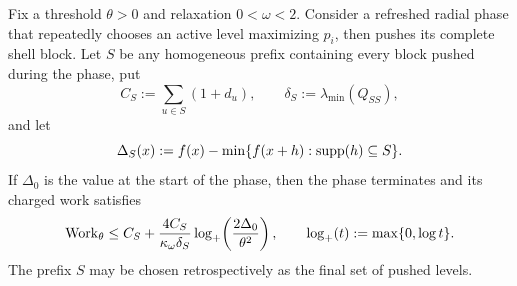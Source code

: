 \begin{lemma}
\label{lem:direct-radial-final-region}
Fix a threshold $\theta>0$ and relaxation $0<\omega<2$.  Consider a
refreshed radial phase that repeatedly chooses an active level maximizing
$p_i$, then pushes its complete shell block.  Let $S$ be any homogeneous
prefix containing every block pushed during the phase, put
\begin{equation*}
 C_S:=\sum_{u\in S}(1+d_u),
 \qquad
 \delta_S:=\lambda_{\min}(Q_{SS}),
\end{equation*}
and let
\begin{equation*}
 \Delta_S(x):=f(x)-\min\{f(x+h):\operatorname{supp}(h)\subseteq S\}.
\end{equation*}
If $\Delta_0$ is the value at the start of the phase, then the phase
terminates and its charged work satisfies
\begin{equation}
 \operatorname{Work}_\theta
 \leq C_S+
 \frac{4C_S}{\kappa_\omega\delta_S}
 \log_+\!\left(\frac{2\Delta_0}{\theta^2}\right),
 \qquad
 \log_+(t):=\max\{0,\log t\}.
 \label{eq:direct-radial-final-region-work}
\end{equation}
The prefix $S$ may be chosen retrospectively as the final set of pushed
levels.
\end{lemma}

